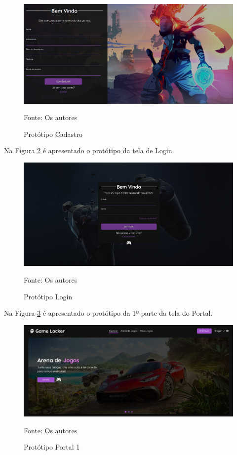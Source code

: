 \begin{apendicesenv}
\begin{figure}[H]
	\centering
	\includegraphics[width=1\textwidth,keepaspectratio]{./imagens/PrototipoCadastro.png}
	\caption{Protótipo Cadastro}
	Fonte: Os autores
    \label{prototipoCadastro}
\end{figure}
\pagebreak

Na Figura \ref{prototipoLogin} é apresentado o protótipo da tela de Login.

\begin{figure}[H]
	\centering
	\includegraphics[width=1\textwidth,keepaspectratio]{./imagens/PrototipoLogin.png}
	\caption{Protótipo Login}
	Fonte: Os autores
    \label{prototipoLogin}
\end{figure}

Na Figura \ref{prototipoPortal} é apresentado o protótipo da 1º parte da tela do Portal.

\begin{figure}[H]
	\centering
	\includegraphics[width=1\textwidth,keepaspectratio]{./imagens/PrototipoPortal.png}
	\caption{Protótipo Portal 1}
	Fonte: Os autores
 \label{prototipoPortal}
\end{figure}
\pagebreak


\end{apendicesenv}

